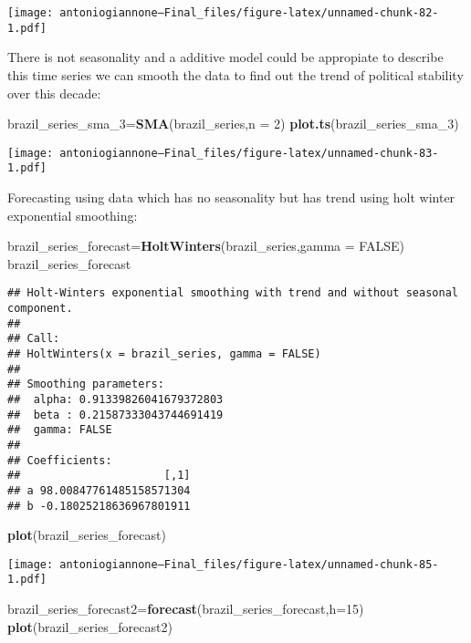 \documentclass[
]{article}
\newenvironment{Shaded}{\begin{snugshade}}{\end{snugshade}}
\newcommand{\AttributeTok}[1]{\textcolor[rgb]{0.13,0.29,0.53}{#1}}
\newcommand{\ConstantTok}[1]{\textcolor[rgb]{0.56,0.35,0.01}{#1}}
\newcommand{\DecValTok}[1]{\textcolor[rgb]{0.00,0.00,0.81}{#1}}
\newcommand{\FunctionTok}[1]{\textcolor[rgb]{0.13,0.29,0.53}{\textbf{#1}}}
\newcommand{\NormalTok}[1]{#1}
\newcommand{\OtherTok}[1]{\textcolor[rgb]{0.56,0.35,0.01}{#1}}
\begin{document}
\texttt{[image: antoniogiannone---Final\_files/figure-latex/unnamed-chunk-82-1.pdf]}

There is not seasonality and a additive model could be appropiate to
describe this time series we can smooth the data to find out the trend
of political stability over this decade:

\begin{Shaded}
\begin{Highlighting}[]
\NormalTok{brazil\_series\_sma\_3}\OtherTok{=}\FunctionTok{SMA}\NormalTok{(brazil\_series,}\AttributeTok{n =} \DecValTok{2}\NormalTok{)}
\FunctionTok{plot.ts}\NormalTok{(brazil\_series\_sma\_3)}
\end{Highlighting}
\end{Shaded}

\texttt{[image: antoniogiannone---Final\_files/figure-latex/unnamed-chunk-83-1.pdf]}

Forecasting using data which has no seasonality but has trend using holt
winter exponential smoothing:

\begin{Shaded}
\begin{Highlighting}[]
\NormalTok{brazil\_series\_forecast}\OtherTok{=}\FunctionTok{HoltWinters}\NormalTok{(brazil\_series,}\AttributeTok{gamma =} \ConstantTok{FALSE}\NormalTok{)}
\NormalTok{brazil\_series\_forecast}
\end{Highlighting}
\end{Shaded}

\begin{verbatim}
## Holt-Winters exponential smoothing with trend and without seasonal component.
## 
## Call:
## HoltWinters(x = brazil_series, gamma = FALSE)
## 
## Smoothing parameters:
##  alpha: 0.91339826041679372803
##  beta : 0.21587333043744691419
##  gamma: FALSE
## 
## Coefficients:
##                      [,1]
## a 98.00847761485158571304
## b -0.18025218636967801911
\end{verbatim}

\begin{Shaded}
\begin{Highlighting}[]
\FunctionTok{plot}\NormalTok{(brazil\_series\_forecast)}
\end{Highlighting}
\end{Shaded}

\texttt{[image: antoniogiannone---Final\_files/figure-latex/unnamed-chunk-85-1.pdf]}

\begin{Shaded}
\begin{Highlighting}[]
\NormalTok{brazil\_series\_forecast2}\OtherTok{=}\FunctionTok{forecast}\NormalTok{(brazil\_series\_forecast,}\AttributeTok{h=}\DecValTok{15}\NormalTok{)}
\FunctionTok{plot}\NormalTok{(brazil\_series\_forecast2)}
\end{Highlighting}
\end{Shaded}
\end{document}
